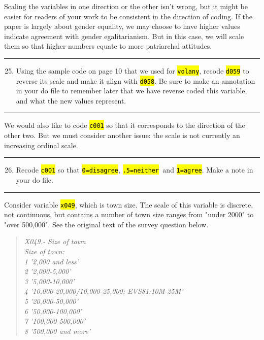 \documentclass{tufte-handout}
\begin{document}
Scaling the variables in one direction or the other isn't wrong, but it might be easier for readers of your work to be consistent in the direction of coding. If the paper is largely about gender equality, we may choose to have higher values indicate agreement with gender egalitarianism. But in this case, we will scale them so that higher numbers equate to more patriarchal attitudes.

\bigskip
\hrule
\bigskip

\begin{enumerate}[leftmargin=.5in]
\setcounter{enumi}{24}
	\item Using the sample code on page 10 that we used for {\tt \hl{volany}}, recode {\tt \hl{d059}} to reverse its scale and make it align with {\tt \hl{d058}}. Be sure to make an annotation in your do file to remember later that we have reverse coded this variable, and what the new values represent.
\end{enumerate}

\bigskip
\hrule
\bigskip
	
We would also like to code {\tt \hl{c001}} so that it corresponds to the direction of the other two. But we must consider another issue: the scale is not currently an increasing ordinal scale.

\bigskip
\hrule
\bigskip

\begin{enumerate}[leftmargin=.5in]
\setcounter{enumi}{25}
	\item Recode {\tt \hl{c001}} so that {\tt \hl{0=disagree}}, {\tt \hl{.5=neither} }and {\tt \hl{1=agree}}. Make a note in your do file.
\end{enumerate}

\bigskip
\hrule
\bigskip
	
\medskip
{}
\medskip

Consider variable {\tt \hl{x049}}, which is town size. The scale of this variable is discrete, not continuous, but contains a number of town size ranges from "under 2000" to "over 500,000". See the original text of the survey question below.

\begin{quote}
{\em
X049.- Size of town\\
Size of town:\\
1 '2,000 and less'\\
2 '2,000-5,000'\\
3 '5,000-10,000'\\
4 '10,000-20,000/10,000-25,000; EVS81:10M-25M'\\
5 '20,000-50,000'\\
6 '50,000-100,000'\\
7 '100,000-500,000'\\
8 '500,000 and more'}\\
\end{quote}
\end{document}

